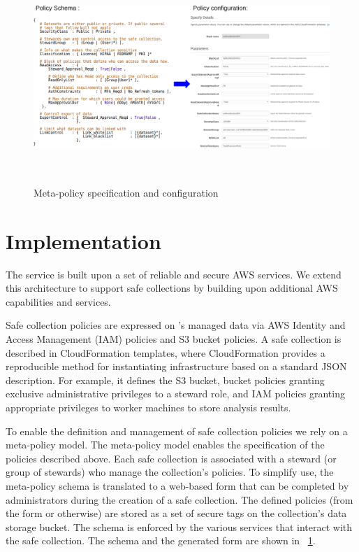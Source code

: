 \begin{figure}%
  \center
  \includegraphics[width=\textwidth, height=8cm]{figures/meta-policy.png}
  \caption{Meta-policy specification and configuration}
  \vspace{-1.5em}
  \label{fig:schema}
\end{figure}

\section{Implementation}

The \NAME service is built upon a set of reliable and secure
AWS services. We extend this architecture to support safe collections
by building upon additional AWS capabilities and services.

Safe collection policies are expressed on \NAMENS's managed
data via AWS Identity and Access Management (IAM) policies
and S3 bucket policies.
A safe collection is described in CloudFormation templates, where
CloudFormation provides a reproducible method for instantiating infrastructure
based on a standard JSON description. For example, it defines
the S3 bucket, bucket policies granting exclusive administrative privileges to a steward role,
and IAM policies granting appropriate privileges to \NAME worker machines to store analysis results.

To enable the definition and management of safe collection policies we
rely on a meta-policy model. The meta-policy model enables the specification
of the policies described above. Each safe collection is associated with a steward
(or group of stewards) who manage the collection's policies. To simplify use, the meta-policy schema
is translated to a web-based form that can be completed by administrators during the creation of a safe collection.
The defined policies (from the form or otherwise) are stored as a set of secure tags
on the collection's data storage bucket. The schema is enforced by the various services that interact
with the safe collection. The schema and the generated form are shown in \figurename~\ref{fig:schema}.

